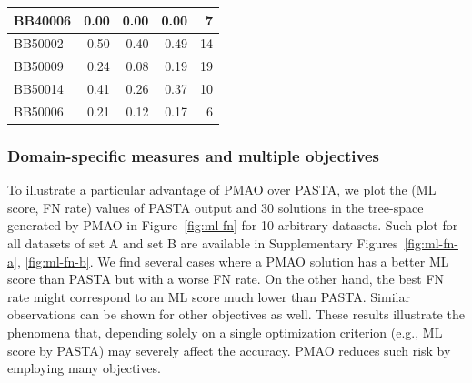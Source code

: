 \documentclass[a4paper,fleqn, review]{cas-dc}
\begin{document}
\begin{table}[!htbp]
\begin{tabular}{|l|r|r|r||r|}
		\hline
		BB40006 & \cellcolor[rgb]{ .988,  1,  .992}0.00 & \cellcolor[rgb]{ .988,  1,  .992}0.00 & \cellcolor[rgb]{ .988,  1,  .992}0.00 & \cellcolor[rgb]{ .988,  .871,  .882}7 \\
		\hline
		BB50002 & \cellcolor[rgb]{ .988,  1,  .992}0.50 & \cellcolor[rgb]{ .384,  .745,  .478}0.40 & \cellcolor[rgb]{ .941,  .98,  .953}0.49 & \cellcolor[rgb]{ .984,  .733,  .741}14 \\
		\hline
		BB50009 & \cellcolor[rgb]{ .988,  1,  .992}0.24 & \cellcolor[rgb]{ .384,  .745,  .478}0.08 & \cellcolor[rgb]{ .788,  .914,  .82}0.19 & \cellcolor[rgb]{ .98,  .631,  .643}19 \\
		\hline
		BB50014 & \cellcolor[rgb]{ .988,  1,  .992}0.41 & \cellcolor[rgb]{ .384,  .745,  .478}0.26 & \cellcolor[rgb]{ .835,  .933,  .863}0.37 & \cellcolor[rgb]{ .984,  .812,  .824}10 \\
		\hline
		BB50006 & \cellcolor[rgb]{ .988,  1,  .992}0.21 & \cellcolor[rgb]{ .384,  .745,  .478}0.12 & \cellcolor[rgb]{ .725,  .886,  .769}0.17 & \cellcolor[rgb]{ .988,  .89,  .902}6 \\
		\hline
	\end{tabular}\label{tab:pmao-pasta-b}\end{table}

\subsubsection{Domain-specific measures and multiple objectives}
To illustrate a particular advantage of PMAO over PASTA, we plot the (ML score, FN rate) values of PASTA output and 30 solutions in the tree-space generated by PMAO in Figure~\ref{fig:ml-fn} for 10 arbitrary datasets. Such plot for all datasets of set A and set B are available in Supplementary Figures~\ref{fig:ml-fn-a}, \ref{fig:ml-fn-b}. We find several cases where a PMAO solution has a better ML score than PASTA but with a worse FN rate.  On the other hand, the best FN rate might correspond to an ML score much lower than PASTA. Similar observations can be shown for other objectives as well. These results illustrate the phenomena that, depending solely on a single optimization criterion (e.g., ML score by PASTA) may severely affect the accuracy. PMAO reduces such risk by employing many objectives.
\end{document}
